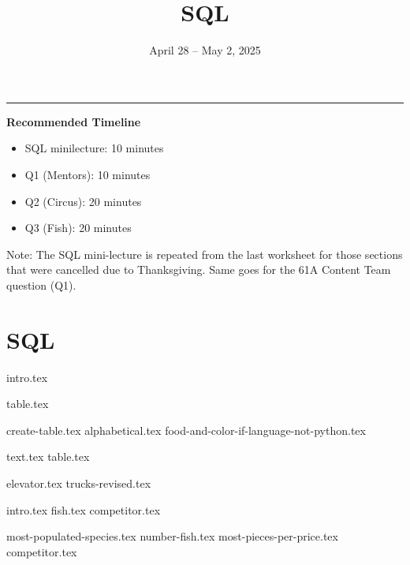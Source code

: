 \documentclass{exam}
\title{SQL}
\date{April 28 -- May 2, 2025}
\begin{document}
\maketitle\rule{\textwidth}{0.15em}

\begin{guide}
    \textbf{Recommended Timeline}
    \begin{itemize}
        \item SQL minilecture: 10 minutes
        \item Q1 (Mentors): 10 minutes
        \item Q2 (Circus): 20 minutes
        \item Q3 (Fish): 20 minutes
    \end{itemize}
    Note: The SQL mini-lecture is repeated from the last worksheet for those sections that were cancelled due to Thanksgiving. Same goes for the 61A Content Team question (Q1).
\end{guide}

\section{SQL}
{intro.tex}
\newpage
\begin{questions}
  \question
  {table.tex}
  \begin{parts}
    {create-table.tex}
    {alphabetical.tex}
    {food-and-color-if-language-not-python.tex}
  \end{parts}

  \newpage
  \question
  {text.tex}
  {table.tex}
  \begin{parts}
    {elevator.tex}
    {trucks-revised.tex}
  \end{parts}
  
  \newpage
  \question 
  {intro.tex}
  {fish.tex}
  {competitor.tex}
  \begin{parts}
    {most-populated-species.tex}
    {number-fish.tex}
    {most-pieces-per-price.tex}
    {competitor.tex}
  \end{parts}
\end{questions}
\end{document}
